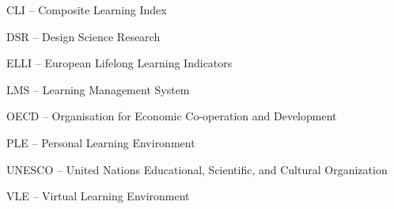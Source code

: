CLI -- Composite Learning Index

DSR -- Design Science Research

ELLI -- European Lifelong Learning Indicators

LMS -- Learning Management System

OECD -- Organisation for Economic Co-operation and Development

PLE -- Personal Learning Environment

UNESCO -- United Nations Educational, Scientific, and Cultural Organization

VLE -- Virtual Learning Environment




